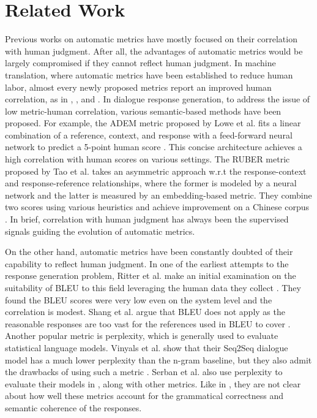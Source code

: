 \documentclass[runningheads]{llncs}
\begin{document}
    \section{Related Work} %
    Previous works on automatic metrics have mostly focused on their correlation with human judgment. After all, the advantages of automatic metrics would be largely compromised if they cannot reflect human judgment. In machine translation, where automatic metrics have been established to reduce human labor, almost every newly proposed metrics report an improved human correlation, as in \cite{NIST}, \cite{METEOR}, and \cite{chrf}. In dialogue response generation, to address the issue of low metric-human correlation, various semantic-based methods have been proposed. For example, the ADEM metric proposed by Lowe et al. fits a linear combination of a reference, context, and response with a feed-forward neural network to predict a 5-point human score \cite{ADEM}. This concise architecture achieves a high correlation with human scores on various settings. The RUBER metric proposed by Tao et al. takes an asymmetric approach w.r.t the response-context and response-reference relationships, where the former is modeled by a neural network and the latter is measured by an embedding-based metric. They combine two scores using various heuristics and achieve improvement on a Chinese corpus \cite{RUBER}. In brief, correlation with human judgment has always been the supervised signals guiding the evolution of automatic metrics.

    On the other hand, automatic metrics have been constantly doubted of their capability to reflect human judgment. In one of the earliest attempts to the response generation problem, Ritter et al. make an initial examination on the suitability of BLEU to this field leveraging the human data they collect \cite{Ritter11}. They found the BLEU scores were very low even on the system level and the correlation is modest. Shang et al. argue that BLEU does not apply as the reasonable responses are too vast for the references used in BLEU to cover \cite{Shang}. Another popular metric is perplexity, which is generally used to evaluate statistical language models. Vinyals et al. show that their Seq2Seq dialogue model has a much lower perplexity than the n-gram baseline, but they also admit the drawbacks of using such a metric \cite{GoogleChatbot}. Serban et al. also use perplexity to evaluate their models in \cite{HRED}, along with other metrics. Like in \cite{GoogleChatbot}, they are not clear about how well these metrics account for the grammatical correctness and semantic coherence of the responses.
\end{document}
